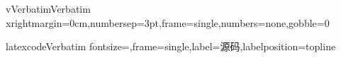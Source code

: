

\DefineShortVerb{\÷}%

\DefineVerbatimEnvironment%
{vVerbatim}{Verbatim}
{xrightmargin=0cm,numbersep=3pt,frame=single,numbers=none,gobble=0}

\DefineVerbatimEnvironment
{latexcode}{Verbatim}
{fontsize=\footnotesize,frame=single,label=源码,labelposition=topline}

